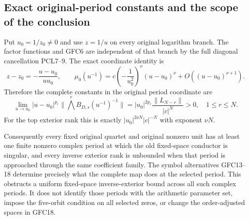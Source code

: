 \subsection{Exact original-period constants and the scope of the conclusion}
Put $u_0=1/z_0\ne0$ and use $z=1/u$ on every original logarithm
branch. The factor functions and GFC6 are independent of that branch
by the full diagonal cancellation PCL7--9. The exact coordinate identity is
\[
 z-z_0=-\frac{u-u_0}{u u_0},\qquad
 \mu_0(u^{-1})=
       c\left(-\frac1{u_0^2}\right)^\nu
                  (u-u_0)^\nu+O((u-u_0)^{\nu+1}).
 \tag{GFC20}
\]
Therefore the complete constants in the original period coordinate are
\[
 \boxed{\quad
 \lim_{u\to u_0}|u-u_0|^{p_r}
       \|\bigwedge^rB_{D,s}(u^{-1})^{-1}\|
   =|u_0|^{2p_r}\frac{\|L_{N-r}\|}{|c|^N}>0,
 \quad 1\le r\le N.
 \quad}\tag{GFC21}
\]
For the top exterior rank this is exactly
$|u_0|^{2\nu N}|c|^{-N}$ with exponent $\nu N$.

Consequently every fixed original quartet and original nonzero unit
has at least one finite nonzero complex period at which the old
fixed-space conductor is singular, and every inverse exterior rank
is unbounded when that period is approached through the same
coefficient family. The symbol alternatives GFC13--18 determine
precisely what the complete map does at the selected period.
This obstructs a uniform fixed-space inverse-exterior bound across
all such complex periods. It does not identify those periods with
the arithmetic parameter set, impose the five-orbit condition on
all selected zeros, or change the order-adjusted spaces in GFC18.

